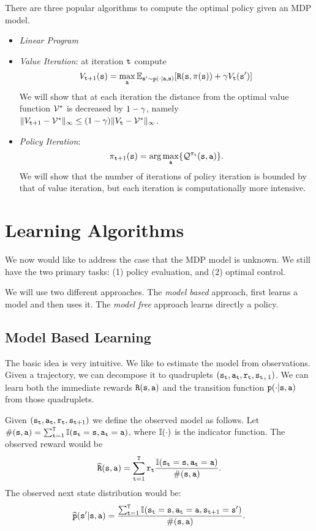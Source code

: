 \medskip
{}
%
There are three popular algorithms to compute the optimal policy
given an MDP model.
\begin{itemize}
\item
{\em Linear Program}
\item
{\em Value Iteration}: at iteration ${\tt t}$ compute
\[
V_{{\tt t}+1}({\tt s})= \max_{\tt a} \mathbb{E}_{{\tt s}'\sim
{\tt p}(\cdot
|{\tt a},{\tt s})}[{\tt R}({\tt s},\pi({\tt s}))+\gamma
V_{\tt t}({\tt s}')]
\]
We will show that at each iteration the distance from the optimal
value function $\mathcal{V}^*$ is decreased by $1-\gamma$, namely
$\|V_{{\tt t}+1}-\mathcal{V}^*\|_\infty\leq
(1-\gamma)\|V_{\tt t}-\mathcal{V}^*\|_\infty$.
\item
{\em Policy Iteration}:
\[
\pi_{{\tt t}+1}({\tt s}) =\arg \max_{\tt a}
\{\mathcal{Q}^{\pi_{\tt t}}({\tt s},{\tt a})\}.
\]
We will show that the number of iterations of policy iteration is
bounded by that of value iteration, but each iteration is
computationally more intensive.
\end{itemize}

\section{Learning Algorithms}

We now would like to address the case that the MDP model is unknown.
We  still have the two primary tasks: (1) policy evaluation, and (2)
optimal control.


We will use two different approaches. The {\em model based}
approach, first learns a model and then uses it. The {\em model
free} approach learns directly a policy.

\subsection{Model Based Learning}

The basic idea is very intuitive. We like to estimate the model from
observations. Given a trajectory, we can decompose it to quadruplets
$({\tt s}_{\tt t},{\tt a}_{\tt t}, {\tt r}_{\tt t},
{\tt s}_{{\tt t}_+1})$. We can learn both the immediate rewards
${\tt R}({\tt s},{\tt a})$ and the transition function
${\tt p}(\cdot|{\tt s},{\tt a})$ from those quadruplets.

\medskip
{}
%
Given
$({\tt s}_{\tt t},{\tt a}_{\tt t},{\tt r}_{\tt t},{\tt s}_{{\tt t}+1})$ we
define the observed model as follows. Let
$\#({\tt s},{\tt a})=\sum_{{\tt t}=1}^{\tt T}
\mathbb{I}({\tt s}_{\tt t}={\tt s},{\tt a}_{\tt t}={\tt a})$, where $\mathbb{I}(\cdot)$
is the indicator function. The observed reward would be
$$\widehat{{\tt R}}({\tt s},{\tt a})=\sum_{{\tt t}=1}^{\tt T} {\tt r}_{\tt t} \frac{\mathbb{I}({\tt s}_{\tt t}={\tt s},{\tt a}_{\tt t}={\tt a})}{\#({\tt s},{\tt a})}.$$ The observed
next state distribution would be:
$$\widehat{{\tt p}}({\tt s}'|{\tt s},{\tt a})=\frac{\sum_{{\tt t}=1}^{\tt T}
 \mathbb{I}({\tt s}_{\tt t}={\tt s},{\tt a}_{\tt t}={\tt a},{\tt s}_{{\tt t}+1}={\tt s}')}{\#({\tt s},{\tt a})}.$$


